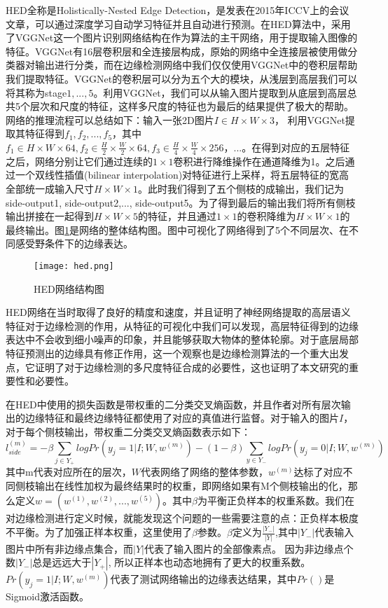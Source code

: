 \documentclass[master]{thesis-uestc}
\begin{document}
HED全称是Holistically-Nested Edge Detection，是发表在2015年ICCV上的会议文章，可以通过深度学习自动学习特征并且自动进行预测。在HED算法中，采用了VGGNet这一个图片识别网络结构在作为算法的主干网络，用于提取输入图像的特征。VGGNet有16层卷积层和全连接层构成，原始的网络中全连接层被使用做分类器对输出进行分类，而在边缘检测网络中我们仅仅使用VGGNet中的卷积层帮助我们提取特征。VGGNet的卷积层可以分为五个大的模块，从浅层到高层我们可以将其称为stage$1,...,5$。利用VGGNet，我们可以从输入图片提取到从底层到高层总共5个层次和尺度的特征，这样多尺度的特征也为最后的结果提供了极大的帮助。网络的推理流程可以总结如下：输入一张2D图片$I \in H \times W \times 3$， 利用VGGNet提取其特征得到$f_1, f_2, ..., f_5$，其中$f_1 \in H \times W \times 64, f_2 \in \frac{H}{2} \times \frac{W}{2} \times 64,  f_3 \in \frac{H}{4} \times \frac{W}{4} \times 256，...$。在得到对应的五层特征之后，网络分别让它们通过连续的$1 \times 1$卷积进行降维操作在通道降维为1。之后通过一个双线性插值(bilinear interpolation)对特征进行上采样，将五层特征的宽高全部统一成输入尺寸$H \times W \times 1$。此时我们得到了五个侧枝的成输出，我们记为side-output1, side-output2,..., side-output5。为了得到最后的输出我们将所有侧枝输出拼接在一起得到$H \times W \times 5$的特征，并且通过$1 \times 1$的卷积降维为$H \times W \times 1$的最终输出。图\ref{hed}是网络的整体结构图。图中可视化了网络得到了5个不同层次、在不同感受野条件下的边缘表达。
\begin{figure}[h!]
    \centering
    \texttt{[image: hed.png]}
    \caption{HED网络结构图}
    \label{hed}
\end{figure}
HED网络在当时取得了良好的精度和速度，并且证明了神经网络提取的高层语义特征对于边缘检测的作用，从特征的可视化中我们可以发现，高层特征得到的边缘表达中不会收到细小噪声的印象，并且能够获取大物体的整体轮廓。对于底层局部特征预测出的边缘具有修正作用，这一个观察也是边缘检测算法的一个重大出发点，它证明了对于边缘检测的多尺度特征合成的必要性，这也证明了本文研究的重要性和必要性。

在HED中使用的损失函数是带权重的二分类交叉熵函数，并且作者对所有层次输出的边缘特征和最终边缘特征都使用了对应的真值进行监督。对于输入的图片$I$，对于每个侧枝输出，带权重二分类交叉熵函数表示如下：
\begin{equation}
l_{side}^{(m)} = - \beta \sum_{j \in Y_+} logPr(y_j = 1 | I; W, w^{(m)}) - (1 - \beta)  \sum_{y \in Y_-} logPr(y_j = 0 | I; W, w^{(m)})
\end{equation}
其中m代表对应所在的层次，$W$代表网络了网络的整体参数，$w^{(m)}$达标了对应不同侧枝输出在线性加权为最终结果时的权重，即网络如果有M个侧枝输出的化，那么定义$w = (w ^{(1)}, w ^{(2)}, ..., w ^{(5)})$。其中$\beta$为平衡正负样本的权重系数。我们在对边缘检测进行定义时候，就能发现这个问题的一些需要注意的点：正负样本极度不平衡。为了加强正样本权重，这里使用了$\beta$参数。$\beta$定义为$\frac{|Y_-|}{|Y|}$,其中$|Y_-|$代表输入图片中所有非边缘点集合，而$|Y|$代表了输入图片的全部像素点。 因为非边缘点个数$|Y_-|$总是远远大于$|Y_+|$, 所以正样本也动态地拥有了更大的权重系数。$Pr(y_j = 1 | I; W, w^{(m)})$代表了测试网络输出的边缘表达结果，其中$Pr()$是Sigmoid激活函数。
\end{document}
